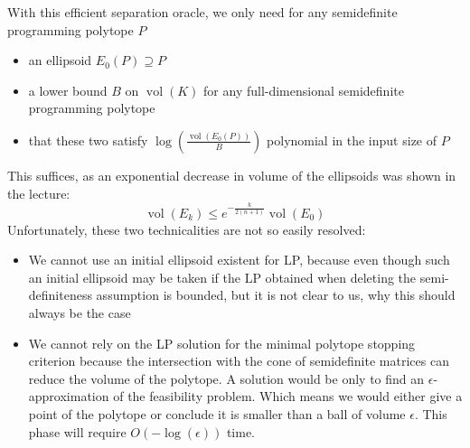 \documentclass{scrartcl}
\newcommand{\vol}{\operatorname{vol}}
\begin{document}
\begin{enumerate}
With this efficient separation oracle, we only need for any semidefinite programming polytope $P$
\begin{itemize}
\item an ellipsoid $E_0(P) \supseteq P$
\item a lower bound $B$ on $\vol (K)$ for any full-dimensional semidefinite programming polytope
\item that these two satisfy  $\log(\frac{\vol(E_0(P))}{B})$ polynomial in the input size of $P$
\end{itemize} 
This suffices, as an exponential decrease in volume of the ellipsoids was shown in the lecture:
\[
\vol(E_k)\le e^{-\frac{k}{2(n+1)}} \vol(E_0)
\]
Unfortunately, these two technicalities are not so easily resolved:
\begin{itemize}
\item We cannot use an initial ellipsoid existent for LP, because even though such an initial ellipsoid may be taken if the LP obtained when deleting the semi-definiteness assumption is bounded, but it is not clear to us, why this should always be the case
\item We cannot rely on the LP solution for the minimal polytope stopping criterion because the intersection with the cone of semidefinite matrices can reduce the volume of the polytope. A solution would be only to find an $\epsilon$-approximation of the feasibility problem. Which means we would either give a point of the polytope or conclude it is smaller than a ball of volume $\epsilon$. This phase will require $O(-\log(\epsilon))$ time.
\end{itemize}

\end{enumerate}
\end{document}

